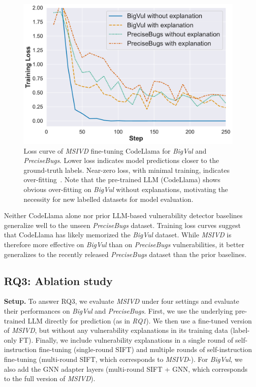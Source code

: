 \documentclass[12pt,openany,oneside,table]{cmuthesis}
\begin{document}
\begin{figure}
\centering
\includegraphics[width=0.7\columnwidth]{figures/results/train_loss.pdf}
\caption{\small Loss curve of \textit{MSIVD} fine-tuning CodeLlama for \textit{BigVul} and \textit{PreciseBugs}. Lower loss indicates model predictions closer to the ground-truth labels. Near-zero loss, with minimal training, indicates over-fitting~\cite{overfitting}. Note that the pre-trained LLM (CodeLlama) shows obvious over-fitting on \textit{BigVul} without explanations, motivating the necessity for new labelled datasets for model evaluation.
}
\label{fig:loss}
\end{figure}



\begin{tcolorbox}
[colback=white,colframe=black,arc=0pt,boxrule=0.5pt,title=RQ2 Summary,boxsep=2pt,left=1pt,right=1pt,top=1pt,bottom=1pt,fonttitle=\bfseries]
Neither CodeLlama alone nor prior LLM-based vulnerability detector baselines generalize well to the unseen \textit{PreciseBugs} dataset. Training loss curves suggest that CodeLlama has likely memorized the \textit{BigVul} dataset. While \textit{MSIVD} is therefore more effective on \textit{BigVul} than on \textit{PreciseBugs} vulnerabilities, it better generalizes to the recently released \textit{PreciseBugs} dataset than the prior baselines. 
\end{tcolorbox}

\subsection{RQ3: Ablation study}
\label{sec:rq3}


\noindent\textbf{Setup.} To answer RQ3, we evaluate \textit{MSIVD} under four settings and evaluate their performances on \textit{BigVul} and \textit{PreciseBugs}. First, we use the underlying pre-trained LLM directly for prediction (as in \textit{RQ1}). We then use a fine-tuned version of \textit{MSIVD}, but without any vulnerability explanations in its training data (label-only FT). Finally, we include vulnerability explanations in a single round of self-instruction fine-tuning (single-round SIFT) and multiple rounds of self-instruction fine-tuning (multi-round SIFT, which corresponds to \textit{MSIVD}-). For \textit{BigVul}, we also add the GNN adapter layers (multi-round SIFT + GNN, which corresponds to the full version of \textit{MSIVD}). 
\end{document}
